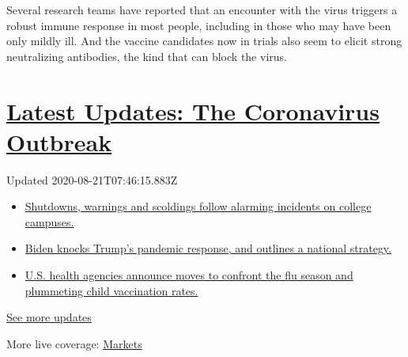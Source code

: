 Several research teams have reported that an encounter with the virus
triggers a robust immune response in most people, including in those who
may have been only mildly ill. And the vaccine candidates now in trials
also seem to elicit strong neutralizing antibodies, the kind that can
block the virus.

\hypertarget{latest-updates-the-coronavirus-outbreak}{%
\section{\texorpdfstring{\href{https://www.nytimes3xbfgragh.onion/2020/08/20/world/coronavirus-covid.html?action=click\&pgtype=Article\&state=default\&region=MAIN_CONTENT_1\&context=storylines_live_updates}{Latest
Updates: The Coronavirus
Outbreak}}{Latest Updates: The Coronavirus Outbreak}}\label{latest-updates-the-coronavirus-outbreak}}

Updated 2020-08-21T07:46:15.883Z

\begin{itemize}
\tightlist
\item
  \href{https://www.nytimes3xbfgragh.onion/2020/08/20/world/coronavirus-covid.html?action=click\&pgtype=Article\&state=default\&region=MAIN_CONTENT_1\&context=storylines_live_updates\#link-68774d88}{Shutdowns,
  warnings and scoldings follow alarming incidents on college campuses.}
\item
  \href{https://www.nytimes3xbfgragh.onion/2020/08/20/world/coronavirus-covid.html?action=click\&pgtype=Article\&state=default\&region=MAIN_CONTENT_1\&context=storylines_live_updates\#link-26b58724}{Biden
  knocks Trump's pandemic response, and outlines a national strategy.}
\item
  \href{https://www.nytimes3xbfgragh.onion/2020/08/20/world/coronavirus-covid.html?action=click\&pgtype=Article\&state=default\&region=MAIN_CONTENT_1\&context=storylines_live_updates\#link-4e542da3}{U.S.
  health agencies announce moves to confront the flu season and
  plummeting child vaccination rates.}
\end{itemize}

\href{https://www.nytimes3xbfgragh.onion/2020/08/20/world/coronavirus-covid.html?action=click\&pgtype=Article\&state=default\&region=MAIN_CONTENT_1\&context=storylines_live_updates}{See
more updates}

More live coverage:
\href{https://www.nytimes3xbfgragh.onion/live/2020/08/20/business/stock-market-today-coronavirus?action=click\&pgtype=Article\&state=default\&region=MAIN_CONTENT_1\&context=storylines_live_updates}{Markets}

